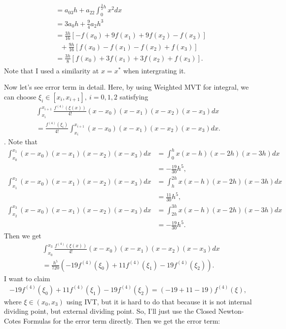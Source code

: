 \documentclass{article}
\begin{document}
\begin{enumerate}
\begin{align}
\begin{split}
            \\ & = a_03h + a_22\int_{0}^{\frac{3}{2}h}x^2dx
            \\ & = 3a_0h + \frac{9}{4}a_2h^3
            \\ & = \frac{3h}{16}[-f(x_0)+9f(x_1)+9f(x_2)-f(x_3)]
            \\ & \ \ \ + \frac{9h}{16}[f(x_0)-f(x_1)-f(x_2)+f(x_3)]
            \\ & = \frac{3h}{8}[f(x_0)+3f(x_1)+3f(x_2)+f(x_3)].
        \end{split}
    \end{align} Note that I used a similarity at $x=x^*$ when intergrating it.
    
    Now let's see error term in detail. Here, by using Weighted MVT for integral, we can choose $\xi_i \in [x_i, x_{i+1}],\ i=0,1,2$ satisfying \begin{align*}
        \int_{x_i}^{x_{i+1}}\frac{f^{(4)}(\xi(x))}{4!}(x-x_0)(x-x_1)(x-x_2)(x-x_3)dx
        \\
        = \frac{f^{(4)}(\xi_i)}{4!} \int_{x_i}^{x_{i+1}}(x-x_0)(x-x_1)(x-x_2)(x-x_3)dx.
    \end{align*}. Note that \begin{align*}
        \int_{x_0}^{x_1}(x-x_0)(x-x_1)(x-x_2)(x-x_3)dx
        & = \int_{0}^{h}x(x-h)(x-2h)(x-3h)dx
        \\ & = -\frac{19}{30}h^5,
        \\ \int_{x_1}^{x_2}(x-x_0)(x-x_1)(x-x_2)(x-x_3)dx
        & = \int_{h}^{2h}x(x-h)(x-2h)(x-3h)dx
        \\ & = \frac{11}{30}h^5,
        \\ \int_{x_2}^{x_3}(x-x_0)(x-x_1)(x-x_2)(x-x_3)dx
        & = \int_{2h}^{3h}x(x-h)(x-2h)(x-3h)dx
        \\ & = -\frac{19}{30}h^5.
    \end{align*} Then we get \begin{align*}
        & \int_{x_0}^{x_3}\frac{f^{(4)}(\xi(x))}{4!}(x-x_0)(x-x_1)(x-x_2)(x-x_3)dx
        \\
        & = \frac{h^5}{720}(-19f^{(4)}(\xi_0) + 11f^{(4)}(\xi_1) - 19f^{(4)}(\xi_2)).
    \end{align*} I want to claim \begin{align*}
        -19f^{(4)}(\xi_0) + 11f^{(4)}(\xi_1) - 19f^{(4)}(\xi_2) = (-19+11-19)f^{(4)}(\xi),
    \end{align*} where $\xi \in (x_0, x_3)$ using IVT, but it is hard to do that because it is not internal dividing point, but external dividing point. So, I'll just use the Closed Newton-Cotes Formulas for the error term directly. Then we get the error term: \begin{align}

\end{align}
\end{enumerate}
\end{document}
